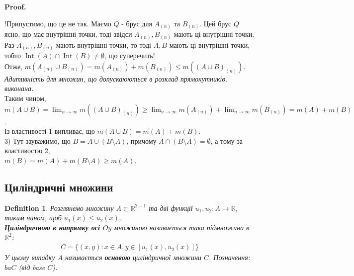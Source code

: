 \documentclass[a4paper, 10pt]{article}
\makeatletter
\def\qed{$\blacksquare$}
\theoremstyle{theoremdd}
\theoremstyle{theoremdd}
\newtheorem{definition}[theorem]{Definition}
\theoremstyle{theoremdd}
\theoremstyle{theoremdd}
\theoremstyle{theoremdd}
\theoremstyle{theoremdd}
\theoremstyle{theoremdd}
\theoremstyle{theoremdd}
\theoremstyle{theoremdd}
\theoremstyle{theoremdd}
\theoremstyle{theoremdd}
\theoremstyle{theoremdd}
\theoremstyle{theoremdd}
\theoremstyle{theoremdd}
\theoremstyle{theoremdd}
\renewenvironment{proof}[1][Proof.\\]{\par
\pushQED{\hfill \qed}%
\normalfont \topsep6\p@\@plus6\p@\relax
\trivlist
\item\relax
{\bfseries
#1\@addpunct{.}}\hspace\labelsep\ignorespaces
}{%
\popQED\endtrivlist\@endpefalse
}
\DeclareMathOperator{\Int}{Int}
\makeatother
\begin{document}
\begin{proof}
!Припустимо, що це не так. Маємо $Q$ - брус для $A_{(n)}$ та $B_{(n)}$. Цей брус $Q$ ясно, що має внутрішні точки, тоді звідси $A_{(n)}, B_{(n)}$ мають ці внутрішні точки. Раз $A_{(n)},B_{(n)}$ мають внутрішні точки, то тоді $A,B$ мають ці внутрішні точки, тобто $\Int(A) \cap \Int(B) \neq \emptyset$, що суперечить!\\
Отже, $m(A_{(n)} \cup B_{(n)}) = m(A_{(n)}) + m(B_{(n)}) \leq m((A \cup B)_{(n)})$.\\
\textit{Адитивність для множин, що допускаюються в розклад прямокутників, виконана.}\\
Таким чином, $m(A \cup B) = \displaystyle\lim_{n \to \infty} m((A \cup B)_{(n)}) \geq \lim_{n \to \infty} m(A_{(n)}) + \lim_{n \to \infty} m(B_{(n)}) = m(A) + m(B)$.\\
Із властивості 1 випливає, що $m(A \cup B) = m(A) + m(B)$.
\bigskip \\
3) Тут зауважимо, що $B = A \cup (B \setminus A)$, причому $A \cap (B \setminus A) = \emptyset$, а тому за властивостю 2,\\
$m(B) = m(A) + m(B \setminus A) \geq m(A)$.
\end{proof}

\subsection{Циліндричні множини}
\begin{definition}
Розглянемо множину $A \subset \mathbb{R}^{2-1}$ та дві функції $u_1,u_2: A \to \mathbb{R}$, таким чином, щоб $u_1(x) \leq u_2(x)$.\\
\textbf{Циліндричною в напрямку осі $Oy$} множиною називається така підмножина в $\mathbb{R}^2$:
\begin{align*}
C = \{ (x,y): x \in A, y \in [u_1(x),u_2(x)] \}
\end{align*}
У цьому випадку $A$ називається \textbf{основою} циліндричної множини $C$. Позначення: $ba C$ (від base $C$).
\begin{figure}[H]
\centering
{}
\end{figure}
\end{definition}
\end{document}

